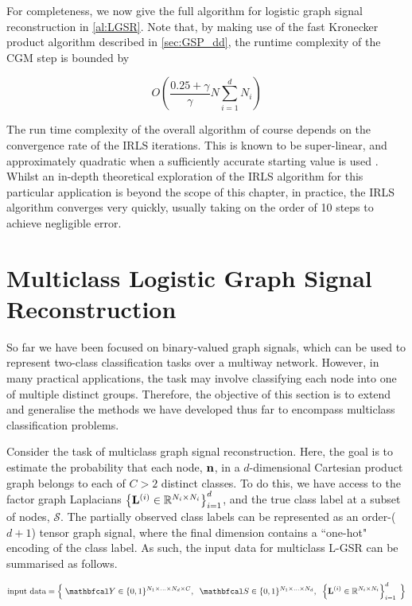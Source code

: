For completeness, we now give the full algorithm for logistic graph signal reconstruction in \cref{al:LGSR}. Note that, by making use of the fast Kronecker product algorithm described in \cref{sec:GSP_dd}, the runtime complexity of the CGM step is bounded by 

\begin{equation*}
    O\left(\frac{0.25 + \gamma}{\gamma} N \sum_{i=1}^d N_i \right)
\end{equation*}

The run time complexity of the overall algorithm of course depends on the convergence rate of the IRLS iterations. This is known to be super-linear, and approximately quadratic when a sufficiently accurate starting value is used \citep{Burden2010}. Whilst an in-depth theoretical exploration of the IRLS algorithm for this particular application is beyond the scope of this chapter, in practice, the IRLS algorithm converges very quickly, usually taking on the order of 10 steps to achieve negligible error.

\section{Multiclass Logistic Graph Signal Reconstruction}

\label{sec:multiclass}

So far we have been focused on binary-valued graph signals, which can be used to represent two-class classification tasks over a multiway network. However, in many practical applications, the task may involve classifying each node into one of multiple distinct groups. Therefore, the objective of this section is to extend and generalise the methods we have developed thus far to encompass multiclass classification problems.

Consider the task of multiclass graph signal reconstruction. Here, the goal is to estimate the probability that each node, $\mathbf{n}$, in a $d$-dimensional Cartesian product graph belongs to each of $C>2$ distinct classes. To do this, we have access to the factor graph Laplacians $\left\{\mathbf{L}^{(i)} \in \mathbb{R}^{N_i \times N_i}\right\}_{i=1}^d$, and the true class label at a subset of nodes, $\mathcal{S}$. The partially observed class labels can be represented as an order-($d + 1$) tensor graph signal, where the final dimension contains a ``one-hot" encoding of the class label. As such, the input data for multiclass L-GSR can be summarised as follows. 

\begin{equation*}
    \text{input data} = \Big\{\; \Yt \in \{0, 1\}^{N_1 \times ... \times N_d \times C}, \;\; \St \in \{0, 1\}^{N_1 \times ... \times N_d} , \;\; \left\{\LL^{(i)} \in \R^{N_i \times N_i}\right\}_{i=1}^d\; \Big\}
\end{equation*}


